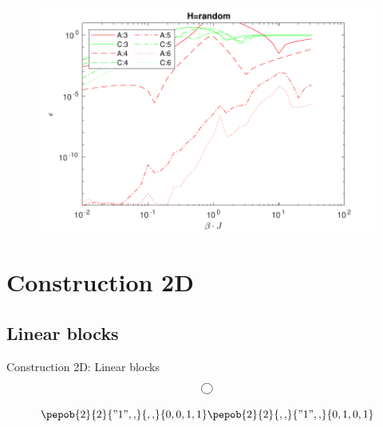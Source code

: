\documentclass[aspectratio=169]{beamer}
\begin{document}
\begin{frame}
    \begin{figure}
        \includegraphics[scale=0.6]{Figures/rand_01.pdf}
    \end{figure}
\end{frame}


\section{Construction 2D}

\subsection{ Linear blocks}

\begin{frame}{Construction 2D: Linear blocks}
    \begin{equation}
        \mpob{1}{ {,}  }{}{}{}{{,,}}
    \end{equation}

    \begin{equation}
        \pepob{2}{2}{{"1",,}}{{,,}}{{0,0,1,1}}  \pepob{2}{2}{{,,}}{{"1",,}}{{0,1,0,1}}
    \end{equation}

\end{frame}
\end{document}
